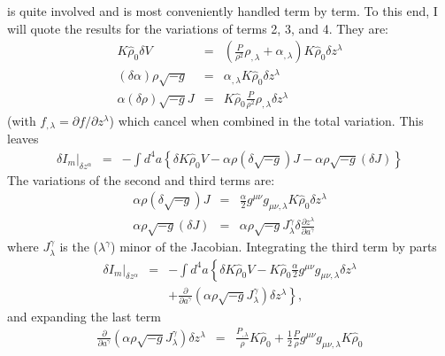 is quite involved and is most conveniently handled term by term.  To this end, I will quote the results for the variations of terms 2, 3, and 4.  They are:
\begin{eqnarray}
K {\hat \rho}_{0} \delta V & = & \left( \frac{P}{\rho^2} \rho_{,\lambda} + \alpha_{,\lambda} \right) K {\hat \rho}_{0} \delta z^{\lambda} \\
(\delta \alpha) \rho \sqrt{-g} & = & \alpha_{,\lambda} K {\hat \rho}_{0} \delta z^{\lambda} \\
\alpha (\delta \rho) \sqrt{-g} J &= & K {\hat \rho}_{0} \frac{P}{\rho^2} \rho_{,\lambda} \delta z^{\lambda}
\end{eqnarray}
(with $f_{,\lambda} = {\partial f}/{\partial z^{\lambda}}$) which cancel when combined in the total variation.
This leaves
\begin{eqnarray}
\delta I_{m} \vert_{\delta z^{\alpha}} 
	& = & 
	- \int d^4a \! 
	\left\{ 
		\delta K {\hat \rho}_{0} V 
		- \alpha \rho (\delta \sqrt{-g}) J 
		- \alpha \rho \sqrt{-g} (\delta J) 
	\right\}
\end{eqnarray}
The variations of the second and third terms are:
\begin{eqnarray}
\alpha \rho (\delta \sqrt{-g}) J & = &  \frac{\alpha}{2} g^{\mu \nu} g_{\mu \nu,\lambda} K {\hat \rho}_{0} \delta z^{\lambda} \\
\alpha \rho \sqrt{-g} (\delta J) & = & \alpha \rho \sqrt{-g} J_{\lambda}^{\gamma} \delta \frac{\partial z^{\lambda}}{\partial a^{\gamma}}
\end{eqnarray}
where $J_{\lambda}^{\gamma}$ is the (${\lambda}^{\gamma}$) minor of the Jacobian.  Integrating the third term by parts
\begin{eqnarray}
\delta I_{m} \vert_{\delta z^{\alpha}} 
	& = & 
	- \int d^4a \! 
	\left\{ 
		\delta K {\hat \rho}_{0} V 
		- K {\hat \rho}_{0} \frac{\alpha}{2} g^{\mu \nu} 
		g_{\mu \nu,\lambda} \delta z^{\lambda} 
	\right. \nonumber \\
	& & 	
	\left.
		+ \frac{\partial}{\partial a^{\gamma}} \left( \alpha \rho \sqrt{-g}
		 J_{\lambda}^{\gamma} \right) \delta z^{\lambda}
	\right\},
\end{eqnarray}
and expanding the last term
\begin{eqnarray}
\frac{\partial}{\partial a^{\gamma}} \left( \alpha \rho \sqrt{-g}
		 J_{\lambda}^{\gamma} \right) \delta z^{\lambda} & = & \frac{P_{,\lambda}}{\rho} K {\hat \rho}_{0} + \frac{1}{2}\frac{P}{\rho}g^{\mu \nu} g_{\mu \nu,\lambda} K {\hat \rho}_{0} 
\end{eqnarray}
